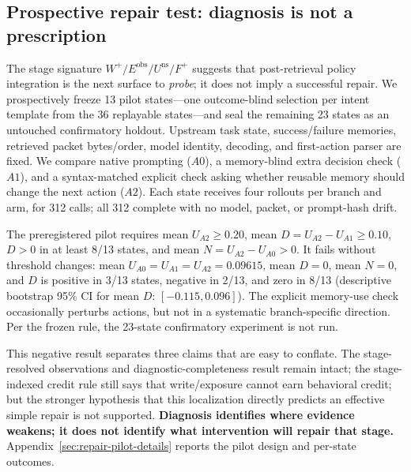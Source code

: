 \subsection{Prospective repair test: diagnosis is not a prescription}
\label{sec:repair-pilot}
The stage signature $W^+/E^{\mathrm{obs}}/U^{\mathrm{ns}}/F^+$ suggests that post-retrieval policy integration is the next surface to \emph{probe}; it does not imply a successful repair. We prospectively freeze 13 pilot states---one outcome-blind selection per intent template from the 36 replayable states---and seal the remaining 23 states as an untouched confirmatory holdout. Upstream task state, success/failure memories, retrieved packet bytes/order, model identity, decoding, and first-action parser are fixed. We compare native prompting ($A0$), a memory-blind extra decision check ($A1$), and a syntax-matched explicit check asking whether reusable memory should change the next action ($A2$). Each state receives four rollouts per branch and arm, for 312 calls; all 312 complete with no model, packet, or prompt-hash drift.

The preregistered pilot requires mean $U_{A2}\ge0.20$, mean $D=U_{A2}-U_{A1}\ge0.10$, $D>0$ in at least 8/13 states, and mean $N=U_{A2}-U_{A0}>0$. It fails without threshold changes: mean $U_{A0}=U_{A1}=U_{A2}=0.09615$, mean $D=0$, mean $N=0$, and $D$ is positive in 3/13 states, negative in 2/13, and zero in 8/13 (descriptive bootstrap 95\% CI for mean $D$: $[-0.115,0.096]$). The explicit memory-use check occasionally perturbs actions, but not in a systematic branch-specific direction. Per the frozen rule, the 23-state confirmatory experiment is not run.

This negative result separates three claims that are easy to conflate. The stage-resolved observations and diagnostic-completeness result remain intact; the stage-indexed credit rule still says that write/exposure cannot earn behavioral credit; but the stronger hypothesis that this localization directly predicts an effective simple repair is not supported. \textbf{Diagnosis identifies where evidence weakens; it does not identify what intervention will repair that stage.} Appendix~\ref{sec:repair-pilot-details} reports the pilot design and per-state outcomes.

